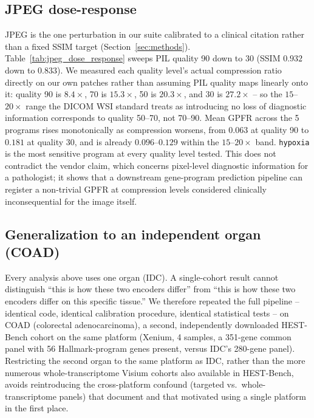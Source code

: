 \documentclass[11pt]{article}
\begin{document}
\subsection{JPEG dose-response}
JPEG is the one perturbation in our suite calibrated to a clinical citation rather than a fixed SSIM target (Section~\ref{sec:methods}). Table~\ref{tab:jpeg_dose_response} sweeps PIL quality 90 down to 30 (SSIM $0.932$ down to $0.833$). We measured each quality level's actual compression ratio directly on our own patches rather than assuming PIL quality maps linearly onto it: quality 90 is $8.4\times$, 70 is $15.3\times$, 50 is $20.3\times$, and 30 is $27.2\times$ -- so the $15$--$20\times$ range the DICOM WSI standard \citep{dicom_wsi_standard} treats as introducing no loss of diagnostic information corresponds to quality 50--70, not 70--90. Mean GPFR across the 5 programs rises monotonically as compression worsens, from $0.063$ at quality 90 to $0.181$ at quality 30, and is already $0.096$--$0.129$ within the $15$--$20\times$ band. \texttt{hypoxia} is the most sensitive program at every quality level tested. This does not contradict the vendor claim, which concerns pixel-level diagnostic information for a pathologist; it shows that a downstream gene-program prediction pipeline can register a non-trivial GPFR at compression levels considered clinically inconsequential for the image itself.



\subsection{Generalization to an independent organ (COAD)}
\label{sec:coad_generalization}
Every analysis above uses one organ (IDC). A single-cohort result cannot distinguish ``this is how these two encoders differ'' from ``this is how these two encoders differ on this specific tissue.'' We therefore repeated the full pipeline -- identical code, identical calibration procedure, identical statistical tests -- on COAD (colorectal adenocarcinoma), a second, independently downloaded HEST-Bench cohort on the same platform (Xenium, 4 samples, a 351-gene common panel with 56 Hallmark-program genes present, versus IDC's 280-gene panel). Restricting the second organ to the same platform as IDC, rather than the more numerous whole-transcriptome Visium cohorts also available in HEST-Bench, avoids reintroducing the cross-platform confound (targeted vs.\ whole-transcriptome panels) that \citet{crossplatform_st_het} document and that motivated using a single platform in the first place.
\end{document}
